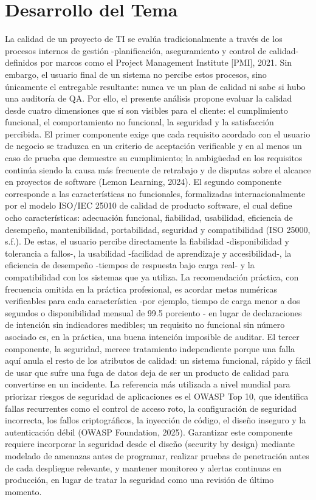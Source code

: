 \documentclass[
	article,			%
	11pt,				%
	oneside,			%
	a4paper,			%
	english,			%
	brazil,				%
	sumario=tradicional
	]{abntex2}
\begin{document}
\section{Desarrollo del Tema}
La calidad de un proyecto de TI se evalúa tradicionalmente a través de los procesos internos de gestión -planificación, aseguramiento y control de calidad- definidos por marcos como el Project Management Institute [PMI], 2021. Sin embargo, el usuario final de un sistema no percibe estos procesos, sino únicamente el entregable resultante: nunca ve un plan de calidad ni sabe si hubo una auditoría de QA. Por ello, el presente análisis propone evaluar la calidad desde cuatro dimensiones que sí son visibles para el cliente: el cumplimiento funcional, el comportamiento no funcional, la seguridad y la satisfacción percibida. El primer componente exige que cada requisito acordado con el usuario de negocio se traduzca en un criterio de
aceptación verificable y en al menos un caso de prueba que demuestre su cumplimiento; la ambigüedad en los requisitos continúa siendo la causa más frecuente de retrabajo y de disputas sobre el alcance en proyectos de software (Lemon Learning, 2024).
El segundo componente corresponde a las características no  funcionales, formalizadas internacionalmente por el modelo ISO/IEC 25010 de calidad de producto software, el cual define ocho características: adecuación funcional, fiabilidad, usabilidad, eficiencia de desempeño, mantenibilidad, portabilidad, seguridad y compatibilidad (ISO 25000, s.f.). De estas, el usuario percibe directamente la fiabilidad -disponibilidad y tolerancia a fallos-, la
usabilidad -facilidad de aprendizaje y accesibilidad-, la eficiencia de desempeño -tiempos de respuesta bajo carga real- y la compatibilidad con los sistemas que ya utiliza. La recomendación práctica, con frecuencia omitida en la práctica profesional, es acordar metas numéricas verificables para cada característica -por ejemplo, tiempo de carga menor a dos segundos o disponibilidad mensual de 99.5 porciento - en lugar de declaraciones de intención sin indicadores medibles; un requisito no funcional sin número asociado es, en la práctica, una buena intención imposible de auditar.
El tercer componente, la seguridad, merece tratamiento independiente porque una falla aquí anula el resto de los atributos de calidad: un sistema funcional, rápido y fácil de usar que sufre una fuga de datos deja de ser un producto de calidad para convertirse en un incidente. La referencia más utilizada a nivel mundial para priorizar riesgos de seguridad de aplicaciones es el OWASP Top 10, que identifica fallas recurrentes como el control de acceso roto, la configuración de seguridad incorrecta, los fallos criptográficos, la inyección de código, el diseño inseguro y la autenticación débil (OWASP Foundation, 2025). Garantizar este componente requiere incorporar la seguridad desde el diseño (security by design) mediante modelado de amenazas antes de programar, realizar pruebas de penetración antes de cada despliegue relevante, y mantener monitoreo y alertas continuas en producción, en lugar de tratar la seguridad como una revisión de último momento.
\end{document}
